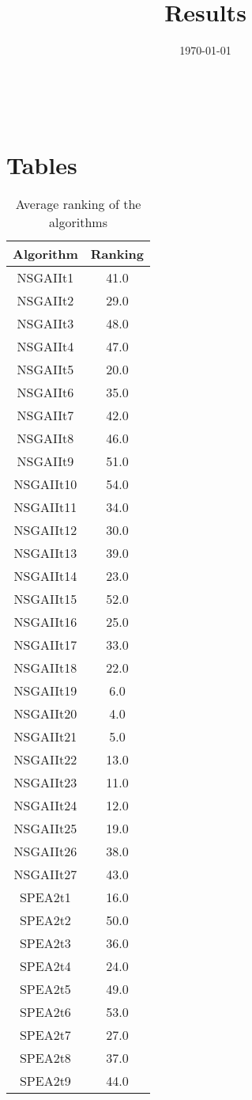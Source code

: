 \documentclass{article}
\title{Results}
\author{}
\date{\today}
\begin{document}
\oddsidemargin 0in \topmargin 0in\maketitle
\
\section{Tables}
\begin{table}[!htp]
\centering
\caption{Average ranking of the algorithms}
\begin{tabular}{c|c}
Algorithm&Ranking\\
\hline
NSGAIIt1&41.0\\
NSGAIIt2&29.0\\
NSGAIIt3&48.0\\
NSGAIIt4&47.0\\
NSGAIIt5&20.0\\
NSGAIIt6&35.0\\
NSGAIIt7&42.0\\
NSGAIIt8&46.0\\
NSGAIIt9&51.0\\
NSGAIIt10&54.0\\
NSGAIIt11&34.0\\
NSGAIIt12&30.0\\
NSGAIIt13&39.0\\
NSGAIIt14&23.0\\
NSGAIIt15&52.0\\
NSGAIIt16&25.0\\
NSGAIIt17&33.0\\
NSGAIIt18&22.0\\
NSGAIIt19&6.0\\
NSGAIIt20&4.0\\
NSGAIIt21&5.0\\
NSGAIIt22&13.0\\
NSGAIIt23&11.0\\
NSGAIIt24&12.0\\
NSGAIIt25&19.0\\
NSGAIIt26&38.0\\
NSGAIIt27&43.0\\
SPEA2t1&16.0\\
SPEA2t2&50.0\\
SPEA2t3&36.0\\
SPEA2t4&24.0\\
SPEA2t5&49.0\\
SPEA2t6&53.0\\
SPEA2t7&27.0\\
SPEA2t8&37.0\\
SPEA2t9&44.0\\

\end{tabular}
\end{table}
\end{document}
